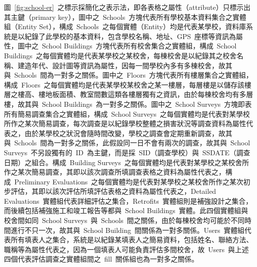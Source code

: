 圖~\ref{fig:school-er}~之標示採簡化之表示法，即各表格之屬性（attribute）只標示出其主鍵（primary key），圖中之~Schools~方塊代表所有學校基本資料集合之實體組（Entity Set），構成~Schools~之每個實體（Entity）均是代表某學校，資料庫系統是以紀錄了此學校的基本資料，包含學校名稱、地址、GPS~座標等資訊為屬性，圖中之~School Buildings~方塊代表所有校舍集合之實體組，構成~School Buildings~之每個實體均是代表某學校之某校舍，每棟校舍是以紀錄其之校舍名稱、建造年代、設計圖等資訊為屬性，因每一間學校內多有多棟校舍，故其與~Schools~間為一對多之關係。圖中之~Floors~方塊代表所有樓層集合之實體組，構成~Floors~之每個實體均是代表某學校某校舍之某一樓層，每層樓是以儲存該樓層之樓高、樓地板面積、教室間數這類各樓層獨有之資訊，由於每棟校舍均有多層樓，故其與~School Buildings~為一對多之關係。圖中之~School Surveys~方塊即表所有簡易調查集合之實體組，構成~School Surveys~之每個實體均是代表對某學校所作之某次簡易調查，每次調查是以紀錄學校整體之損害狀況等調查資料為屬性代表之，由於某學校之狀況會隨時間改變，學校之調查會定期重新調查，故其與~Schools~間為一對多之關係，此假設同一日不會有兩次的調查，故其與~School Surveys~不另設獨有的~ID~為主鍵，而是採~SID（調查學校）與~SSDATE（調查日期）之組合。構成~Building Surveys~之每個實體均是代表對某學校之某校舍所作之某次簡易調查，其即以該次調查所填調查表格之資料為屬性代表之，構成~Preliminary Evaluations~之每個實體均是代表對某學校之某校舍所作之某次初步評估，其即以該次評估所填評估表格之資料為屬性代表之，Detailed Evaluations~實體組代表詳細評估之集合，Retrofits~實體組則是補強設計之集合，而後續包括補強施工和竣工報告等都與~School Buildings~實體。此四個實體組與校舍間如同~School Surveys~與~Schools~間之關係，由於每棟校舍均可能於不同時間進行不只一次，故其與~School Building~間關係為一對多關係。Users~實體組代表所有填表人之集合，系統是以紀錄某填表人之簡易資料，包括姓名、聯絡方法、職稱等為屬性代表之，因為一個填表人可能負責評估多間校舍，故~Users~與上述四個代表評估調查之實體組間之~fill~關係組也為一對多之關係。







